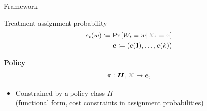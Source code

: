 \documentclass[xcolor={table}]{beamer}
\begin{document}
\note{
\scriptsize \singlespacing

}
\begin{frame}{Framework}

\begin{wideitemize}
\item Treatment assignment probability
\begin{equation*}
\begin{split}
e_t(w)\coloneqq  \Pr\left[{W_t = w \textcolor{lightgray}{|\X_t = x}}\right]\\
\e \coloneqq (e(1), \dots, e(k))
\end{split}
\end{equation*}\pause
\item \textbf{Policy}
\begin{equation*}
\pi : \HB\textcolor{lightgray}{, \X} \rightarrow \e\text, 
\end{equation*} \pause
\begin{itemize}
\item Constrained by a policy class $\Pi$ \pause \\
(functional form, cost constraints in assignment probabilities)
\end{itemize}
\end{wideitemize}

\end{frame}


\note{
\scriptsize \singlespacing

}
\end{document}
